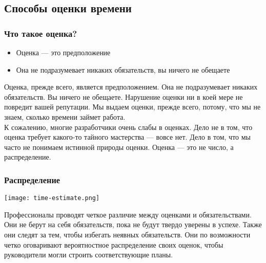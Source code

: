 \documentclass{../industrial-development}
\begin{document}
\subsection{Способы оценки времени}
\begin{frame} \frametitle{Что такое оценка?}
\begin{itemize}
  \item Оценка --- это предположение
	\item Она не подразумевает никаких обязательств, вы ничего не обещаете
\end{itemize}
\end{frame}
\lecturenotes
Оценка, прежде всего, является предположением. Она не подразумевает никаких обязательств. Вы ничего не обещаете. Нарушение оценки ни в коей мере не повредит вашей репутации. Мы выдаем оценки, прежде всего, потому, что мы не знаем, сколько времени займет работа.\\
К сожалению, многие разработчики очень слабы в оценках. Дело не в том, что оценка требует какого-то тайного мастерства — вовсе нет. Дело в том, что мы часто не понимаем истинной природы оценки. Оценка — это не число, а распределение. 

\begin{frame} \frametitle{Распределение}
{\texttt{[image: time-estimate.png]}}
\end{frame}
\lecturenotes
Профессионалы проводят четкое различие между оценками и обязательствами. Они не берут на себя обязательств, пока не будут твердо уверены в успехе. Также они следят за тем, чтобы избегать неявных обязательств. Они по возможности четко оговаривают вероятностное распределение своих оценок, чтобы руководители могли строить соответствующие планы.
\end{document}

